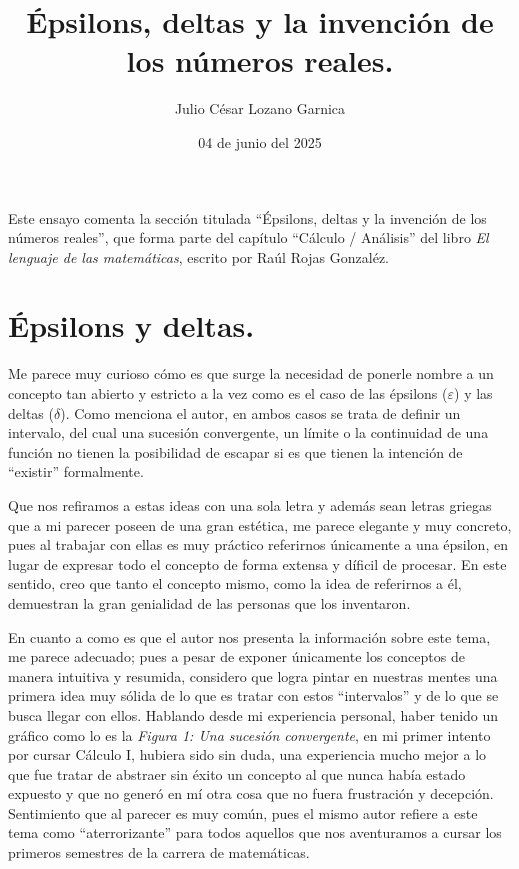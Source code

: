 \documentclass[a4paper,10pt]{article}
\title{\huge{Épsilons, deltas y la invención de los números reales.}}
\author{Julio César Lozano Garnica}
\date{04 de junio del 2025}
\begin{document}
\maketitle

Este ensayo comenta la sección titulada \enquote{Épsilons, deltas y la invención de los números reales}, que forma parte del capítulo \enquote{Cálculo / Análisis} del libro \textit{El lenguaje de las matemáticas}, escrito por Raúl Rojas Gonzaléz. 

\section*{Épsilons y deltas.}

Me parece muy curioso cómo es que surge la necesidad de ponerle nombre a un concepto tan abierto y estricto a la vez como es el caso de las épsilons ($\varepsilon$) y las deltas ($\delta$). Como menciona el autor, en ambos casos se trata de definir un intervalo, del cual una sucesión convergente, un límite o la continuidad de una función no tienen la posibilidad de escapar si es que tienen la intención de \enquote{existir} formalmente. 

Que nos refiramos a estas ideas con una sola letra y además sean letras griegas que a mi parecer poseen de una gran estética, me parece elegante y muy concreto, pues al trabajar con ellas es muy práctico referirnos únicamente a una épsilon, en lugar de expresar todo el concepto de forma extensa y díficil de procesar. En este sentido, creo que tanto el concepto mismo, como la idea de  referirnos a él, demuestran la gran genialidad de las personas que los inventaron.

En cuanto a como es que el autor nos presenta la información sobre este tema, me parece adecuado; pues a pesar de exponer únicamente los conceptos de manera intuitiva y resumida, considero que logra pintar en nuestras mentes una primera idea muy sólida de lo que es tratar con estos \enquote{intervalos} y de lo que se busca llegar con ellos. Hablando desde mi experiencia personal, haber tenido un gráfico como lo es la \textit{ Figura 1: Una sucesión convergente}, en mi primer intento por cursar Cálculo I, hubiera sido sin duda, una experiencia mucho mejor a lo que fue tratar de abstraer sin éxito un concepto al que nunca había estado expuesto y que no generó en mí otra cosa que no fuera frustración y decepción. Sentimiento que al parecer es muy común, pues el mismo autor refiere a este tema como \enquote{aterrorizante} para todos aquellos que nos aventuramos a cursar los primeros semestres de la carrera de matemáticas.
\end{document}
